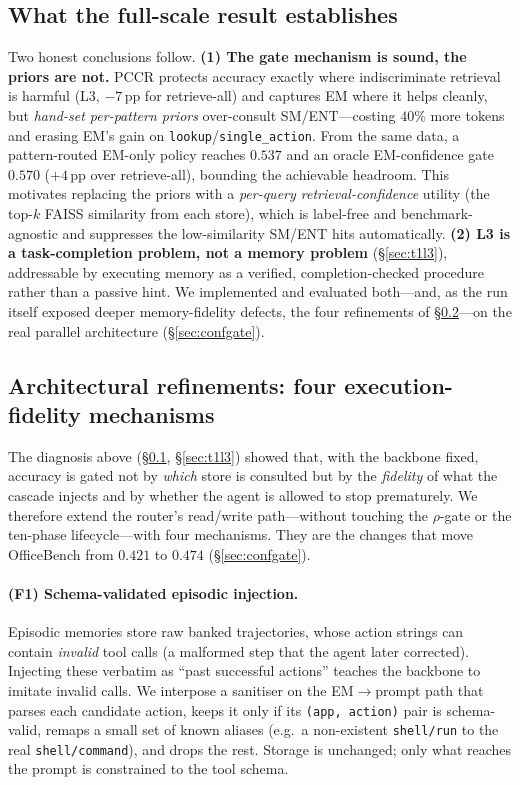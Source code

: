 \documentclass[10pt,twocolumn]{article}
\newcommand{\code}[1]{\texttt{\small #1}}
\begin{document}
\subsection{What the full-scale result establishes}\label{sec:t1disc}
Two honest conclusions follow. \textbf{(1) The gate mechanism is sound, the priors are
not.} PCCR protects accuracy exactly where indiscriminate retrieval is harmful (L3,
$-7$\,pp for retrieve-all) and captures EM where it helps cleanly, but \emph{hand-set
per-pattern priors} over-consult SM/ENT---costing $40\%$ more tokens and erasing EM's gain
on \code{lookup}/\code{single\_action}. From the same data, a pattern-routed EM-only
policy reaches $0.537$ and an oracle EM-confidence gate $0.570$ ($+4$\,pp over
retrieve-all), bounding the achievable headroom. This motivates replacing the priors with
a \emph{per-query retrieval-confidence} utility (the top-$k$ FAISS similarity from each
store), which is label-free and benchmark-agnostic and suppresses the low-similarity
SM/ENT hits automatically. \textbf{(2) L3 is a task-completion problem, not a memory problem}
(\S\ref{sec:t1l3}), addressable by executing memory as a verified, completion-checked
procedure rather than a passive hint. We implemented and evaluated both---and, as the run itself
exposed deeper memory-fidelity defects, the four refinements of \S\ref{sec:fidelity}---on the real
parallel architecture (\S\ref{sec:confgate}).

\subsection{Architectural refinements: four execution-fidelity mechanisms}\label{sec:fidelity}
The diagnosis above (\S\ref{sec:t1disc}, \S\ref{sec:t1l3}) showed that, with the backbone fixed,
accuracy is gated not by \emph{which} store is consulted but by the \emph{fidelity} of what the
cascade injects and by whether the agent is allowed to stop prematurely. We therefore extend the
router's read/write path---without touching the $\rho$-gate or the ten-phase lifecycle---with four
mechanisms. They are the changes that move OfficeBench from $0.421$ to $0.474$ (\S\ref{sec:confgate}).

\paragraph{(F1) Schema-validated episodic injection.} Episodic memories store raw banked
trajectories, whose action strings can contain \emph{invalid} tool calls (a malformed step that the
agent later corrected). Injecting these verbatim as ``past successful actions'' teaches the backbone
to imitate invalid calls. We interpose a sanitiser on the EM$\to$prompt path that parses each
candidate action, keeps it only if its \texttt{(app, action)} pair is schema-valid, remaps a small
set of known aliases (e.g.\ a non-existent \texttt{shell/run} to the real \texttt{shell/command}),
and drops the rest. Storage is unchanged; only what reaches the prompt is constrained to the tool
schema.
\end{document}
